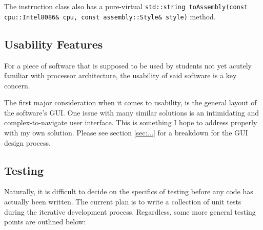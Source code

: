     The instruction class also has a pure-virtual \texttt{std::string toAssembly(const cpu::Intel8086\& cpu, const assembly::Style\& style)} method.

\subsection{Usability Features}
    For a piece of software that is supposed to be used by students not yet acutely familiar with processor architecture, the usability of said software is a key concern.

    The first major consideration when it comes to usability, is the general layout of the software's GUI. One issue with many similar solutions is an intimidating and complex-to-navigate user interface. This is something I hope to address properly with my own solution. Please see section \ref{sec:...} for a breakdown for the GUI design process.

\subsection{Testing}
    Naturally, it is difficult to decide on the specifics of testing before any code has actually been written. The current plan is to write a collection of unit tests during the iterative development process. Regardless, some more general testing points are outlined below:
